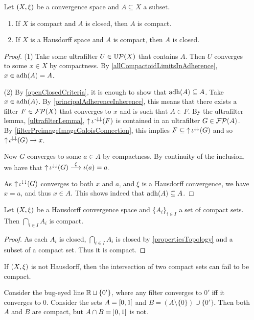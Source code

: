 \begin{proposition} \label{compactClosedSets}
Let $\left( X,\xi \right)$ be a convergence space and $A\subseteq X$ a subset.
\begin{enumerate}
\item If $X$ is compact and $A$ is closed, then $A$ is compact.
\item If $X$ is a Hausdorff space and $A$ is compact, then $A$ is closed.
\end{enumerate}
\end{proposition}
\begin{proof}
(1) Take some ultrafilter $U\in \operatorname{\mathbb{U}\mathcal{P}}(X)$ that contains $A$. Then $U$ converges to some $x\in X$ by compactness.
By \ref{allCompactoidLimitsInAdherence}, $x\in \operatorname{adh}(A) = A$.

(2) By \ref{openClosedCriteria}, it is enough to show that $\operatorname{adh}(A)\subseteq A$. Take $x\in \operatorname{adh}(A)$. By \ref{principalAdherenceInherence}, this means that there exists a filter $F\in \operatorname{\mathcal{FP}}(X)$ that converges to $x$ and is such that $A\in F$. By the ultrafilter lemma, \ref{ultrafilterLemma}, $\operatorname{\uparrow} \iota^{{\text{\hspace{0.15em}-}\downarrow}\downarrow}(F)$ is contained in an ultrafilter $G\in \operatorname{\mathcal{FP}}(A)$. By
\ref{filterPreimageImageGaloisConnection}, this implies $F\subseteq \operatorname{\uparrow}\iota^{\downarrow\downarrow}(G)$ and so $\operatorname{\uparrow}\iota^{\downarrow\downarrow}(G) \to x$.

Now $G$ converges to some $a\in A$ by compactness. By continuity of the inclusion, we have that $\operatorname{\uparrow}\iota^{\downarrow\downarrow}(G) \overset{\xi}{\longrightarrow} \iota(a) = a$.

As $\operatorname{\uparrow}\iota^{\downarrow\downarrow}(G)$ converges to both $x$ and $a$, and $\xi$ is a Hausdorff convergence, we have $x = a$, and thus $x\in A$. This shows indeed that $\operatorname{adh}(A)\subseteq A$.
\end{proof}
\begin{corollary} \label{HausdorffCompactIntersection}
Let $\left( X,\xi \right)$ be a Hausdorff convergence space and $\{A_i\}_{i\in I}$ a set of compact sets. Then $\bigcap_{i\in I}A_i$ is compact.
\end{corollary}
\begin{proof}
As each $A_i$ is closed, $\bigcap_{i\in I}A_i$ is closed by \ref{propertiesTopology} and a subset of a compact set. Thus it is compact.
\end{proof}

\begin{example}
If $\left( X,\xi \right)$ is not Hausdorff, then the intersection of two compact sets can fail to be compact.

Consider the bug-eyed line $\mathbb{R}\sqcup\{0'\}$, where any filter converges to $0'$ iff it converges to $0$. Consider the sets $A = \interval{0,1}$ and $B= (A\setminus\{0\})\cup \{0'\}$. Then both $A$ and $B$ are compact, but $A\cap B = \interval[oc]{0,1}$ is not.
\end{example}


